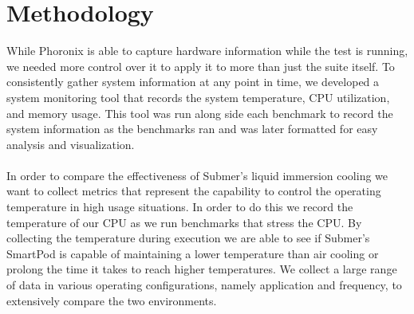 \documentclass[sigconf]{acmart}
\begin{document}
\section{Methodology}
While Phoronix is able to capture hardware information while the test is running, we needed more control over it to apply it to more than just the suite itself. To consistently gather system information at any point in time, we developed a system monitoring tool that records the system temperature, CPU utilization, and memory usage. This tool was run along side each benchmark to record the system information as the benchmarks ran and was later formatted for easy analysis and visualization.
\\\\
In order to compare the effectiveness of Submer's liquid immersion cooling we want to collect metrics that represent the capability to control the operating temperature in high usage situations. In order to do this we record the temperature of our CPU as we run benchmarks that stress the CPU. By collecting the temperature during execution we are able to see if Submer's SmartPod is capable of maintaining a lower temperature than air cooling or prolong the time it takes to reach higher temperatures. We collect a large range of data in various operating configurations, namely application and frequency, to extensively compare the two environments.
\end{document}

